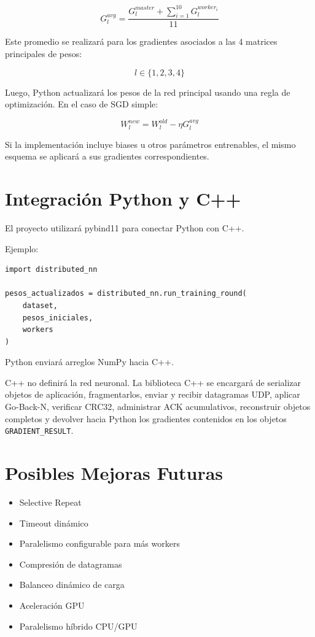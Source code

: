 \documentclass[12pt]{article}
\begin{document}
\[
G_l^{avg} =
\frac{
G_l^{master} + \sum_{i=1}^{10} G_l^{worker_i}
}{11}
\]

Este promedio se realizará para los gradientes asociados a las 4 matrices principales de pesos:

\[
l \in \{1, 2, 3, 4\}
\]

Luego, Python actualizará los pesos de la red principal usando una regla de optimización. En el caso de SGD simple:

\[
W_l^{new} = W_l^{old} - \eta G_l^{avg}
\]

Si la implementación incluye biases u otros parámetros entrenables, el mismo esquema se aplicará a sus gradientes correspondientes.

\section{Integración Python y C++}

El proyecto utilizará pybind11 para conectar Python con C++.

Ejemplo:

\begin{verbatim}
import distributed_nn

pesos_actualizados = distributed_nn.run_training_round(
    dataset,
    pesos_iniciales,
    workers
)
\end{verbatim}

Python enviará arreglos NumPy hacia C++.

C++ no definirá la red neuronal. La biblioteca C++ se encargará de serializar objetos de aplicación, fragmentarlos, enviar y recibir datagramas UDP, aplicar Go-Back-N, verificar CRC32, administrar ACK acumulativos, reconstruir objetos completos y devolver hacia Python los gradientes contenidos en los objetos \texttt{GRADIENT\_RESULT}.

\section{Posibles Mejoras Futuras}

\begin{itemize}
\item Selective Repeat
\item Timeout dinámico
\item Paralelismo configurable para más workers
\item Compresión de datagramas
\item Balanceo dinámico de carga
\item Aceleración GPU
\item Paralelismo híbrido CPU/GPU
\end{itemize}
\end{document}
